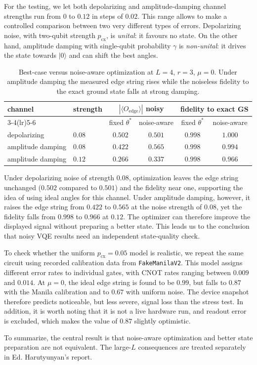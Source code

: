 For the testing, we let both depolarizing and amplitude-damping channel strengths run from $0$ to $0.12$ in steps of $0.02$.  This range allows to make a
controlled comparison between two very different types of errors.  Depolarizing noise,
with two-qubit strength $p_{\mathrm{cx}}$, is \emph{unital}: it favours no state.
On the other hand, amplitude damping with single-qubit probability $\gamma$
is \emph{non-unital}: it drives the state towards $|0\rangle$ and can shift the best
angles.

\begin{table}[H]
  \centering
  \small
  \begin{tabular}{llcccc}
    \toprule
    channel & strength & \multicolumn{2}{c}{$|\langle O_{\mathrm{edge}}\rangle|$ noisy}
      & \multicolumn{2}{c}{fidelity to exact GS}\\
    \cmidrule(lr){3-4}\cmidrule(lr){5-6}
      & & fixed $\theta^*$ & noise-aware & fixed $\theta^*$ & noise-aware\\
    \midrule
    depolarizing & $0.08$ & $0.502$ & $0.501$ & $0.998$ & $1.000$\\
    amplitude damping & $0.08$ & $0.422$ & $0.565$ & $0.998$ & $0.994$\\
    amplitude damping & $0.12$ & $0.266$ & $0.337$ & $0.998$ & $0.966$\\
    \bottomrule
  \end{tabular}
  \caption{Best-case versus noise-aware optimization at $L=4$, $r=3$, $\mu=0$.
  Under amplitude damping the measured edge string rises while the noiseless
  fidelity to the exact ground state falls at strong damping.}
  \label{tab:noisy}
\end{table}

Under depolarizing noise of strength $0.08$, optimization leaves the edge string
unchanged ($0.502$ compared to $0.501$) and the fidelity near one, supporting the idea of using
ideal angles for this channel.  Under amplitude damping, however, it raises the edge
string from $0.422$ to $0.565$ at the noise strength of $0.08$, yet the fidelity falls from $0.998$ to
$0.966$ at $0.12$.  The optimizer can therefore improve the displayed signal
without preparing a better state.  This leads us to the conclusion that noisy VQE results need an independent
state-quality check.

To check whether the uniform $p_{\mathrm{cx}}=0.05$ model is realistic, we
repeat the same circuit using recorded calibration data from
\texttt{FakeManilaV2}.  This model assigns different error rates to individual
gates, with CNOT rates ranging between $0.009$ and $0.014$.  At $\mu=0$, the ideal
edge string is found to be $0.99$, but falls to $0.87$ with the Manila calibration and to
$0.67$ with uniform noise.  The device snapshot therefore predicts noticeable,
but less severe, signal loss than the stress test.  In addition, it is worth noting that it is not a live hardware
run, and readout error is excluded, which makes the value of $0.87$ slightly optimistic.

To summarize, the central result is that noise-aware optimization and better state preparation
are not equivalent.  The large-$L$ consequences are treated separately in Ed.
Harutyunyan's report.
